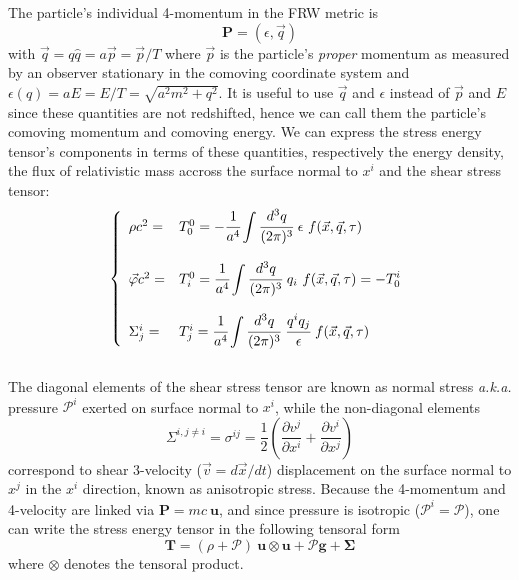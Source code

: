 The particle's individual 4-momentum in the FRW metric is
\begin{equation}
\pmb{P} = \left( \epsilon, \vec{q} \right)
\end{equation} with $\vec{q} = q \hat{q} = a \vec{p} = \vec{p}/T$ where $\vec{p}$ is the particle's \emph{proper} momentum as measured by an observer stationary in the comoving coordinate system and $\epsilon(q) = a E = E/T = \sqrt{a^2 m^2 + q^2}$. It is useful to use $\vec{q}$ and $\epsilon$ instead of $\vec{p}$ and $E$ since these quantities are not redshifted, hence we can call them the particle's comoving momentum and comoving energy. We can express the stress energy tensor's components in terms of these quantities, respectively the energy density, the flux of relativistic mass accross the surface normal to $x^i$ and the shear stress tensor:\\

\begin{equation}
\label{sys:stress_energy_tensor_components}
\left\{
\begin{array}{ll}
\rho c^2 = & T^0_0 = -\cfrac{1}{a^4} \displaystyle \int \cfrac{d^3q}{(2\pi)^3}~ \epsilon~ f(\vec{x}, \vec{q}, \tau)\\
\\
\vec{\varphi} c^2 = & T^0_i = \cfrac{1}{a^4} \displaystyle \int \cfrac{d^3q}{(2\pi)^3}~ q_i~ f(\vec{x}, \vec{q}, \tau) = - T_0^i\\
\\
\Sigma^i_j = & T^i_j = \cfrac{1}{a^4} \displaystyle \int \cfrac{d^3q}{(2\pi)^3}~ \cfrac{q^i q_j}{\epsilon}~ f(\vec{x}, \vec{q}, \tau)
\end{array}
\right.
\end{equation} \\

The diagonal elements of the shear stress tensor are known as normal stress \textit{a.k.a.} pressure $\mathcal{P}^i$ exerted on surface normal to $x^i$, while the non-diagonal elements
\begin{equation}
\Sigma^{i,j \neq i} = \sigma^{ij} = \frac{1}{2} \left( \frac{\partial v^j}{\partial x^i} + \frac{\partial v^i}{\partial x^j} \right)
\end{equation} correspond to shear 3-velocity ($\vec{v} = d\vec{x}/dt$) displacement on the surface normal to $x^j$ in the $x^i$ direction, known as anisotropic stress. Because the 4-momentum and 4-velocity are linked via $\pmb{P} = mc~\pmb{u}$, and since pressure is isotropic ($\mathcal{P}^i = \mathcal{P}$), one can write the stress energy tensor in the following tensoral form 
\begin{equation}
\pmb{T} = (\rho + \mathcal{P})~ \pmb{u} \otimes \pmb{u} + \mathcal{P}\pmb{g} + \pmb{\Sigma}
\end{equation} where $\otimes$ denotes the tensoral product.\\

